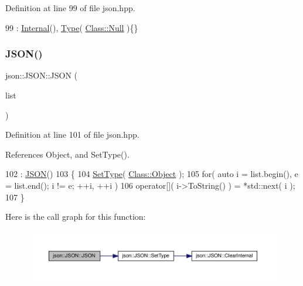 Definition at line 99 of file json.\+hpp.


\begin{DoxyCode}
99 : \mbox{\hyperlink{classjson_1_1_j_s_o_n_a1e2a064794c3d55c8bb8887fc5734947}{Internal}}(), \mbox{\hyperlink{classjson_1_1_j_s_o_n_a3fa6923afa41bdfe38077fbc0079aaf5}{Type}}( \mbox{\hyperlink{classjson_1_1_j_s_o_n_a762f55df6d407c1af61607ed516ffe07abbb93ef26e3c101ff11cdd21cab08a94}{Class::Null}} )\{\}
\end{DoxyCode}
\mbox{\label{classjson_1_1_j_s_o_n_acada0833f1b9fb6974610c031b6eabe7}} 
\subsubsection{\texorpdfstring{J\+S\+O\+N()}{JSON()}\hspace{0.1cm}{\footnotesize\ttfamily [2/9]}}
{\footnotesize\ttfamily json\+::\+J\+S\+O\+N\+::\+J\+S\+ON (\begin{DoxyParamCaption}\item[{initializer\+\_\+list$<$ \mbox{\hyperlink{classjson_1_1_j_s_o_n}{J\+S\+ON}} $>$}]{list }\end{DoxyParamCaption})\hspace{0.3cm}{\ttfamily [inline]}}



Definition at line 101 of file json.\+hpp.



References Object, and Set\+Type().


\begin{DoxyCode}
102             : \mbox{\hyperlink{classjson_1_1_j_s_o_n_a0334c8643ae2a6cd86020e02643bb20f}{JSON}}() 
103         \{
104             \mbox{\hyperlink{classjson_1_1_j_s_o_n_a668500208950e48394fc8bfe7c320205}{SetType}}( \mbox{\hyperlink{classjson_1_1_j_s_o_n_a762f55df6d407c1af61607ed516ffe07a497031794414a552435f90151ac3b54b}{Class::Object}} );
105             \textcolor{keywordflow}{for}( \textcolor{keyword}{auto} i = list.begin(), e = list.end(); i != e; ++i, ++i )
106                 \textcolor{keyword}{operator}[]( i->ToString() ) = *std::next( i );
107         \}
\end{DoxyCode}
Here is the call graph for this function\+:
\nopagebreak
\begin{figure}[H]
\begin{center}
\leavevmode
\includegraphics[width=350pt]{classjson_1_1_j_s_o_n_acada0833f1b9fb6974610c031b6eabe7_cgraph}
\end{center}
\end{figure}
\mbox{\label{classjson_1_1_j_s_o_n_aff59b496d6cebc650355071d32c62edb}} 
